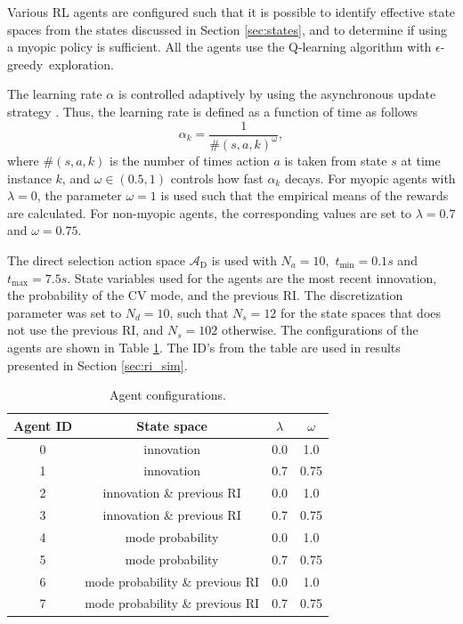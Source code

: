 \documentclass[english, 12pt, a4paper, elec, utf8, a-1b, online]{aaltothesis}
\numberwithin{equation}{section}
\newcommand{\As}{\mathcal{A}}
\newcommand{\egreedy}{$\epsilon$-greedy~}
\newcommand{\tmax}{t_\text{max}}
\newcommand{\tmin}{t_\text{min}}
\newcommand{\Asdir}{\As_\text{D}}
\begin{document}
Various RL agents are configured such that it is possible to identify effective state spaces from the states discussed in Section \ref{sec:states}, and to determine if using a myopic policy is sufficient.
All the agents use the Q-learning algorithm with \egreedy exploration.

The learning rate $\alpha$ is controlled adaptively by using the asynchronous update strategy \cite{Even-Dar2003}.
Thus, the learning rate is defined as a function of time as follows
\begin{equation}
    \alpha_k = \frac{1}{\#(s, a, k)^\omega},
\end{equation}
where $\#(s, a, k)$ is the number of times action $a$ is taken from state $s$ at time instance $k$, and $\omega \in (0.5, 1)$ controls how fast $\alpha_k$ decays.
For myopic agents with $\lambda=0$, the parameter $\omega=1$ is used such that the empirical means of the rewards are calculated.
For non-myopic agents, the corresponding values are set to $\lambda=0.7$ and $\omega=0.75$. 

The direct selection action space $\Asdir$ is used with $N_a=10,$ $\tmin=0.1s$ and $\tmax=7.5s$.
State variables used for the agents are the most recent innovation, the probability of the CV mode, and the previous RI.
The discretization parameter was set to $N_d=10$, such that $N_s=12$ for the state spaces that does not use the previous RI, and $N_s=102$ otherwise.
The configurations of the agents are shown in Table \ref{tab:agent_configurations}. The ID's from the table are used in results presented in Section \ref{sec:ri_sim}.

\begin{table}[t]
    \centering
    \begin{tabular}{|c | c | c |c |}
        \hline
        \textbf{Agent ID} & \textbf{State space}  & $\lambda$  &  $\omega$ \\
        \hline
        0 & innovation & 0.0 & 1.0 \\ \hline
        1 & innovation & 0.7 & 0.75 \\ \hline
        2 & innovation \& previous RI &  0.0 & 1.0 \\ \hline
        3 & innovation \& previous RI & 0.7 & 0.75 \\ \hline
        4 & mode probability &  0.0 & 1.0 \\ \hline
        5 & mode probability & 0.7 & 0.75 \\ \hline 
        6 & mode probability \& previous RI &  0.0 & 1.0 \\ \hline 
        7 & mode probability \& previous RI & 0.7 & 0.75 \\
        \hline
    \end{tabular}
    \caption{Agent configurations.}
    \label{tab:agent_configurations}
\end{table}
\end{document}
